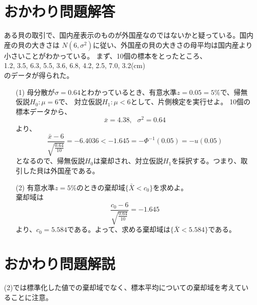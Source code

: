 \documentclass[a4j,uplatex,dvipdfmx]{jsarticle}
\begin{document}
\section*{おかわり問題解答}
ある貝の取引で、国内産表示のものが外国産なのではないかと疑っている。国内産の貝の大きさは
$N(6,\sigma ^2)$に従い、外国産の貝の大きさの母平均は国内産より小さいことがわかっている。
まず、10個の標本をとったところ、\\
1.2, 3.5, 6.3, 5.5, 3.6, 6.8, 4.2, 2.5, 7.0, 3.2(cm)\\
のデータが得られた。
\begin{itemize}
  \item[(1)]母分散が$\sigma=0.64$とわかっているとき、有意水準$z=0.05=5\%$で、帰無仮説$H_0 : \mu=6$で、
  対立仮説$H_1 : \mu <6$として、片側検定を実行せよ。
  10個の標本データから、
  \begin{equation}
    \bar{x}=4.38,~~~\sigma^2=0.64
  \end{equation}
  より、
  \begin{equation}
    \frac{\bar{x}-6}{\sqrt{\frac{0.64}{10}}}=-6.4036<-1.645=-\Phi ^{-1}(0.05)=-u(0.05)
  \end{equation}
  となるので、帰無仮説$H_0$は棄却され、対立仮説$H_1$を採択する。つまり、取引した貝は外国産である。

  \item[(2)]有意水準$z=5\%$のときの棄却域$\{\bar {X}<c_0 \}$を求めよ。\\
  棄却域は
  \begin{equation}
    \frac{c_0-6}{\sqrt{\frac{0.64}{10}}}=-1.645
  \end{equation} 
  より、$c_0=5.584$である。よって、求める棄却域は$\{ \bar{X}<5.584 \}$である。
\end{itemize}

\section*{おかわり問題解説}
(2)では標準化した値での棄却域でなく、標本平均についての棄却域を考えていることに注意。
\end{document}
